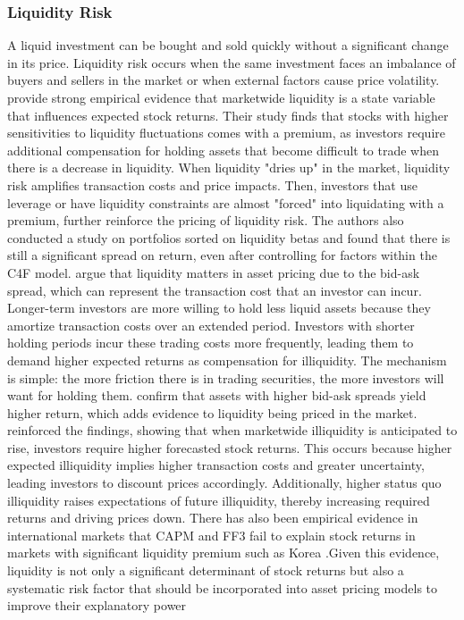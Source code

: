 \subsubsection{Liquidity Risk}
A liquid investment can be bought and sold quickly without a significant change in its price. Liquidity risk occurs when the same investment faces an imbalance of buyers and sellers in the market or when external factors cause price volatility.  provide strong empirical evidence that marketwide liquidity is a state variable that influences expected stock returns. Their study finds that stocks with higher sensitivities to liquidity fluctuations comes with a premium, as investors require additional compensation for holding assets that become difficult to trade when there is a decrease in liquidity. When liquidity "dries up" in the market, liquidity risk amplifies transaction costs and price impacts. Then, investors that use leverage or have liquidity constraints are almost "forced" into liquidating with a premium, further reinforce the pricing of liquidity risk. The authors also conducted a study on portfolios sorted on liquidity betas and found that there is still a significant spread on return, even after controlling for factors within the C4F model.  argue that liquidity matters in asset pricing due to the bid-ask spread, which can represent the transaction cost that an investor can incur. Longer-term investors are more willing to hold less liquid assets because they amortize transaction costs over an extended period. Investors with shorter holding periods incur these trading costs more frequently, leading them to demand higher expected returns as compensation for illiquidity. The mechanism is simple: the more friction there is in trading securities, the more investors will want for holding them. confirm that assets with higher bid-ask spreads yield higher return, which adds evidence to liquidity being priced in the market.  reinforced the findings, showing that when marketwide illiquidity is anticipated to rise, investors require higher forecasted stock returns. This occurs because higher expected illiquidity implies higher transaction costs and greater uncertainty, leading investors to discount prices accordingly. Additionally, higher status quo illiquidity raises expectations of future illiquidity, thereby increasing required returns and driving prices down. There has also been empirical evidence in international markets that CAPM and FF3 fail to explain stock returns in markets with significant liquidity premium such as Korea \cite{jang_2012}.Given this evidence, liquidity is not only a significant determinant of stock returns but also a systematic risk factor that should be incorporated into asset pricing models to improve their explanatory power 


